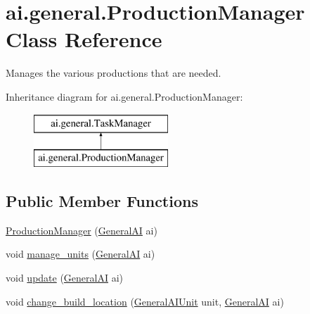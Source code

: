 \hypertarget{classai_1_1general_1_1_production_manager}{
\section{ai.general.ProductionManager Class Reference}
\label{classai_1_1general_1_1_production_manager}
}


Manages the various productions that are needed.  


Inheritance diagram for ai.general.ProductionManager:\begin{figure}[H]
\begin{center}
\leavevmode
\includegraphics[height=2.000000cm]{classai_1_1general_1_1_production_manager}
\end{center}
\end{figure}
\subsection*{Public Member Functions}
\begin{DoxyCompactItemize}
\item 
\hyperlink{classai_1_1general_1_1_production_manager_a2293da9562e9345097ab0c951551c761}{ProductionManager} (\hyperlink{classai_1_1general_1_1_general_a_i}{GeneralAI} ai)
\item 
void \hyperlink{classai_1_1general_1_1_production_manager_a076cbb861ae6fd6023049ce2ecee6cda}{manage\_\-units} (\hyperlink{classai_1_1general_1_1_general_a_i}{GeneralAI} ai)
\item 
void \hyperlink{classai_1_1general_1_1_production_manager_a21674afcbd70ba10ee88ed673569945b}{update} (\hyperlink{classai_1_1general_1_1_general_a_i}{GeneralAI} ai)
\item 
void \hyperlink{classai_1_1general_1_1_production_manager_ab74ba1d7d170a5770c573e7d70e69661}{change\_\-build\_\-location} (\hyperlink{classai_1_1general_1_1_general_a_i_unit}{GeneralAIUnit} unit, \hyperlink{classai_1_1general_1_1_general_a_i}{GeneralAI} ai)
\end{DoxyCompactItemize}
